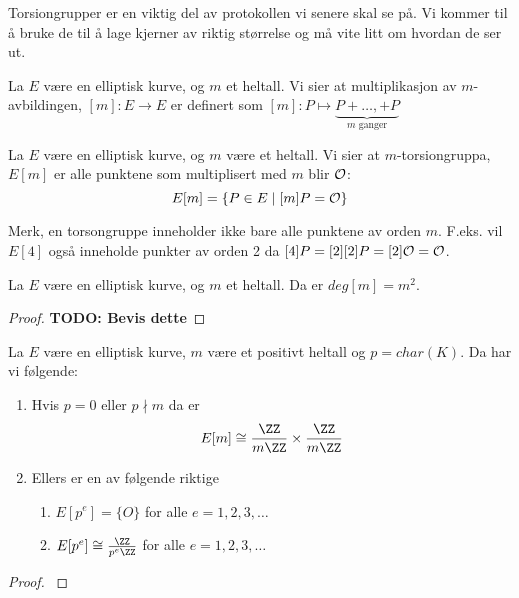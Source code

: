 
Torsiongrupper er en viktig del av protokollen vi senere skal se på. Vi kommer til å bruke de til å lage kjerner av riktig størrelse og må vite litt om hvordan de ser ut.

\begin{definisjon}
La $E$ være en elliptisk kurve, og $m$ et heltall. Vi sier at multiplikasjon av $m$-avbildingen, $[m]: E \rightarrow E$ er definert som $[m]: P \mapsto \underbrace{P + \ldots, + P}_{m \text{ ganger}}$
\end{definisjon}

\begin{definisjon}
La $E$ være en elliptisk kurve, og $m$ være et heltall. Vi sier at $m$-torsiongruppa, $E[m]$ er alle punktene som multiplisert med $m$ blir $\mathcal{O}$: $$E[m] = \{P \in E \mid [m]P = \mathcal{O} \} $$
\end{definisjon}

Merk, en torsongruppe inneholder ikke bare alle punktene av orden $m$. F.eks. vil $E[4]$ også inneholde punkter av orden 2 da $[4]P = [2][2]P = [2] \mathcal{O} = \mathcal{O}$.

\begin{proposisjon}
La $E$ være en elliptisk kurve, og $m$ et heltall. Da er $deg[m] = m^2$. 

\begin{proof}
\textbf{TODO: Bevis dette} 
\end{proof}
\end{proposisjon}

\begin{korollar}
\label{torsonstruktur}
La $E$ være en elliptisk kurve, $m$ være et positivt heltall og $p = char(K)$. Da har vi følgende:
\begin{enumerate}
    \item Hvis $p = 0$ eller $p \nmid m$ da er $$ E[m] \cong \frac{\ZZ}{m\ZZ} \times \frac{\ZZ}{m\ZZ} $$
    \item Ellers er en av følgende riktige \begin{enumerate}
        \item $E[p^e] = \{O\}$ for alle $e = 1, 2, 3, \ldots$
        \item $E[p^e] \cong \frac{\ZZ}{p^e\ZZ}$ for alle $e = 1, 2, 3, \ldots$
    \end{enumerate}
\end{enumerate}

\begin{proof}
\cite[III 6.4]{silverman}
\end{proof}
\end{korollar}


